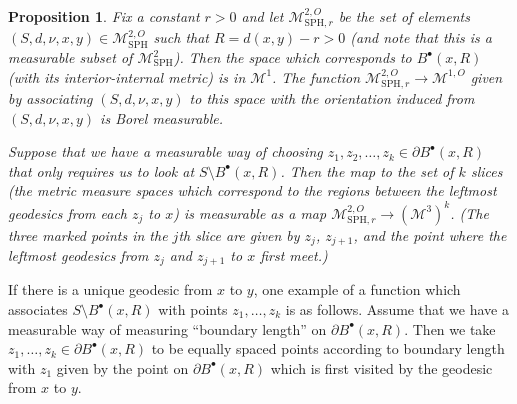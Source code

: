 \documentclass[10pt]{amsart}
\let\mathcal\mathscr
\newcommand{\sbullet}{{\scriptscriptstyle\bullet}}
\theoremstyle{plain}
\numberwithin{theorem}{section}
\newtheorem{proposition}[theorem]{Proposition}
\theoremstyle{definition}
\newcommand\gmsspace{{\mathcal M}_{\mathrm{SPH}}}
\newcommand\gmsspacer{{\mathcal M}_{\mathrm{SPH},r}}
\newcommand\mmspace{{\mathcal M}}
\newcommand{\fb}[2]{B^\sbullet(#1,#2)}
\begin{document}
\begin{proposition}
\label{prop::ball_interior_measurable}
Fix a constant $r > 0$ and let $\gmsspacer^{2,O}$ be the set of elements $(S,d,\nu,x,y) \in \gmsspace^{2,O}$ such that $R = d(x,y) - r > 0$ (and note that this is a \hbox{measurable} subset of $\gmsspace^2$). Then the space which corresponds to $\fb{x}{R}$ (with its interior-internal metric) is in $\mmspace^1$. The function $\gmsspacer^{2,O} \to \mmspace^{1,O}$ given by associating $(S,d,\nu,x,y)$ to this space with the orientation induced from $(S,d,\nu,x,y)$ is Borel measurable.

Suppose that we have a measurable way of choosing $z_1, z_2, \ldots, z_k \in \partial \fb{x}{R}$ that only requires us to look at $S \setminus \fb{x}{R}$. Then the map to the set of $k$ slices (\ie the metric measure spaces which correspond to the regions between the leftmost geodesics from each $z_j$ to $x$) is measurable as a map $\gmsspacer^{2,O} \to (\mmspace^3)^k$. (The three marked points in the $j$th slice are given by $z_j$, $z_{j+1}$, and the point where the leftmost geodesics from $z_j$ and $z_{j+1}$ to $x$ first meet.)
\end{proposition}
If there is a unique geodesic from $x$ to $y$, one example of a function which associates $S \setminus \fb{x}{R}$ with points $z_1,\ldots,z_k$ is as follows. Assume that we have a measurable way of measuring ``boundary length'' on $\partial \fb{x}{R}$. Then we take $z_1,\ldots,z_k \in \partial \fb{x}{R}$ to be equally spaced points according to boundary length with $z_1$ given by the point on $\partial \fb{x}{R}$ which is first visited by the geodesic from $x$ to $y$.
\end{document}
